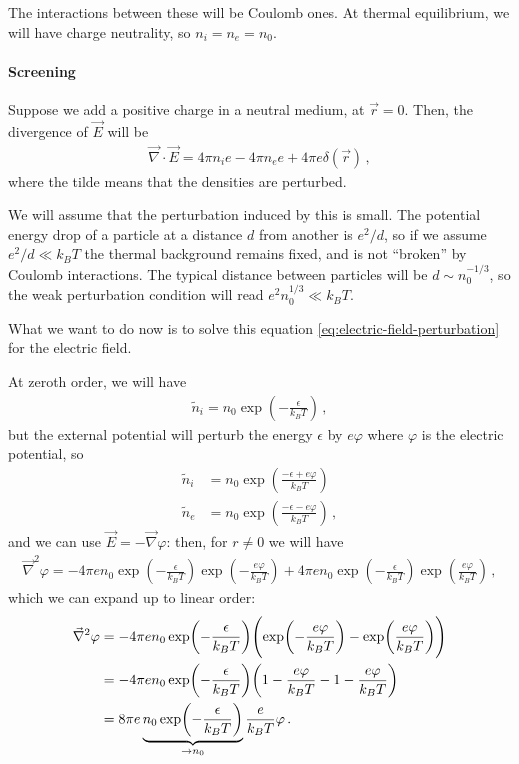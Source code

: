 \documentclass[main.tex]{subfiles}
\begin{document}
The interactions between these will be Coulomb ones. 
At thermal equilibrium, we will have charge neutrality, so \(n_i = n_e = n_0\). 

\paragraph{Screening}

Suppose we add a positive charge in a neutral medium, at \(\vec{r} = 0\). 
Then, the divergence of \(\vec{E}\) will be 
%
\begin{align} \label{eq:electric-field-perturbation}
\vec{\nabla} \cdot \vec{E} = 4 \pi n_i e - 4 \pi n_e e + 4 \pi e \delta (\vec{r})
\,,
\end{align}
%
where the tilde means that the densities are perturbed. 

We will assume that the perturbation induced by this is small. The potential energy drop of a particle at a distance \(d\) from another is \(e^2 / d\), so if we assume \(e^2 / d \ll k_B T\) the thermal background remains fixed, and is not ``broken'' by Coulomb interactions. 
The typical distance between particles will be \(d \sim n_0^{-1/3}\), so the weak perturbation condition will read \(e^2 n_0^{1/3} \ll k_B T\). 

What we want to do now is to solve this equation \eqref{eq:electric-field-perturbation} for the electric field.

At zeroth order, we will have 
%
\begin{align}
\widetilde{n}_i = n_0 \exp(- \frac{\epsilon}{k_B T})
\,,
\end{align}
%
but the external potential will perturb the energy \(\epsilon \) by \(e \varphi \) where \(\varphi \) is the electric potential, so 
%
\begin{subequations}
\begin{align}
\widetilde{n}_i &= n_0 \exp(\frac{- \epsilon + e \varphi }{k_B T})  \\
\widetilde{n}_e &= n_0 \exp(\frac{- \epsilon - e \varphi }{k_B T})
\,,
\end{align}
\end{subequations}
%
and we can use \(\vec{E} = - \vec{\nabla} \varphi \): then, for \(r \neq 0\) we will have
%
\begin{align}
\vec{\nabla}^2 \varphi = 
- 4 \pi e n_0 \exp(- \frac{\epsilon }{k_B T}) 
\exp( - \frac{e \varphi }{k_B T})
+ 4 \pi e n_0 \exp(- \frac{\epsilon }{k_B T}) \exp( \frac{e \varphi }{k_B T})
\,,
\end{align}
%
which we can expand up to linear order: 
%
\begin{subequations}
\begin{align}
\vec{\nabla}^2 \varphi &= 
- 4 \pi e n_0 \exp(- \frac{\epsilon }{k_B T}) 
\qty( \exp(- \frac{e \varphi }{k_B T}) - \exp(\frac{e \varphi }{k_B T}))  \\
&= 
- 4 \pi e n_0 \exp(- \frac{\epsilon }{k_B T}) 
\qty(1 - \frac{e \varphi }{k_BT} - 1 - \frac{e \varphi }{k_B T})  \\
&=
8 \pi e \underbrace{n_0 \exp(- \frac{\epsilon }{k_B T})}_{ \to n_0 } 
\frac{e }{k_B T} \varphi
\,.
\end{align}
\end{subequations}
\end{document}

